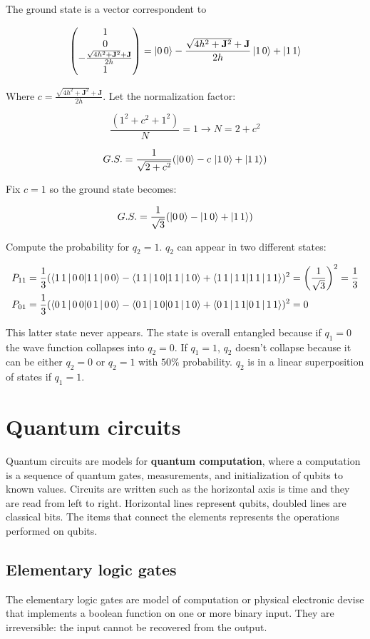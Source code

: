 	The ground state is a vector correspondent to

	$$\begin{pmatrix}1\\0\\-\frac{\sqrt{4h^2+\mathbf{J}^2}+\mathbf{J}}{2h}\\1 \end{pmatrix}=\ket{0\,0}-\frac{\sqrt{4h^2+\mathbf{J}^2}+\mathbf{J}}{2h}\ket{1\,0}+\ket{1\,1}$$

	Where $c=\frac{\sqrt{4h^2+\mathbf{J}^2}+\mathbf{J}}{2h}$.
	Let the normalization factor:

	$$\frac{(1^2+c^2+1^2)}{N}=1 \rightarrow N=2+c^2$$

	$$G.S.=\frac{1}{\sqrt{2+c^2}}(\ket{0\,0}-c\,\ket{1\,0}+\ket{1\,1})$$

	Fix $c=1$ so the ground state becomes:

	$$G.S.= \frac{1}{\sqrt{3}}(\ket{0\,0}-\ket{1\,0}+\ket{1\,1})$$

	Compute the probability for $q_2=1$.
	$q_2$ can appear in two different states:

	\begin{align*}
		P_{1 1}&=\frac{1}{3}(\braket{1\,1\,|\,0\,0}-\braket{1\,1\,|\,1\,0}+\braket{1\,1\,|\,1\,1})^2=\bigg(\frac{1}{\sqrt{3}}\bigg)^2=\frac{1}{3}\\
		P_{0 1}&=\frac{1}{3}(\braket{0\,1\,|\,0\,0}-\braket{0\,1\,|\,1\,0}+\braket{0\,1\,|\,1\,1})^2=0
	\end{align*}

	This latter state never appears.
	The state is overall entangled because if $q_1=0$ the wave function collapses into $q_2=0$.
	If $q_1=1$, $q_2$ doesn't collapse because it can be either $q_2=0$ or $q_2=1$ with $50\%$ probability.
	$q_2$ is in a linear superposition of states if $q_1=1$.

\section{Quantum circuits}
Quantum circuits are models for \textbf{quantum computation},
where a computation is a sequence of quantum gates, measurements, and initialization of qubits to known values.
Circuits are written such as the horizontal axis is time and they are read from left to right.
Horizontal lines represent qubits, doubled lines are classical bits.
The items that connect the elements represents the operations performed on qubits.

	\subsection{Elementary logic gates}
	The elementary logic gates are model of computation or physical electronic devise that implements a boolean function on one or more binary input.
	They are irreversible: the input cannot be recovered from the output.

